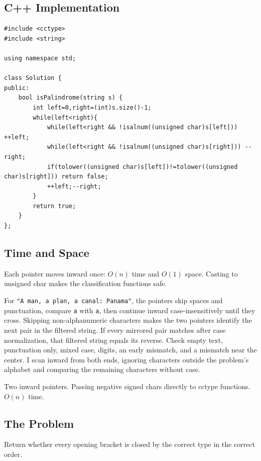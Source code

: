 \subsection{C++ Implementation}
\begin{lstlisting}[style=compactcode,caption={Complete C++ solution: Valid Palindrome}]
#include <cctype>
#include <string>

using namespace std;

class Solution {
public:
    bool isPalindrome(string s) {
        int left=0,right=(int)s.size()-1;
        while(left<right){
            while(left<right && !isalnum((unsigned char)s[left])) ++left;
            while(left<right && !isalnum((unsigned char)s[right])) --right;
            if(tolower((unsigned char)s[left])!=tolower((unsigned char)s[right])) return false;
            ++left;--right;
        }
        return true;
    }
};
\end{lstlisting}

\subsection{Time and Space}
Each pointer moves inward once: \(O(n)\) time and \(O(1)\) space. Casting to
unsigned char makes the classification functions safe.

\lessonexpansion
  {For \texttt{"A man, a plan, a canal: Panama"}, the pointers skip spaces
   and punctuation, compare \texttt{a} with \texttt{a}, then continue inward
   case-insensitively until they cross.}
  {Skipping non-alphanumeric characters makes the two pointers identify the
   next pair in the filtered string. If every mirrored pair matches after case
   normalization, that filtered string equals its reverse.}
  {Check empty text, punctuation only, mixed case, digits, an early mismatch,
   and a mismatch near the center.}
  {I scan inward from both ends, ignoring characters outside the problem's
   alphabet and comparing the remaining characters without case.}

  {Two inward pointers.}
  {Passing negative signed chars directly to cctype functions.}{$O(n)$ time.}



\subsection{The Problem}
Return whether every opening bracket is closed by the correct type in the
correct order.

